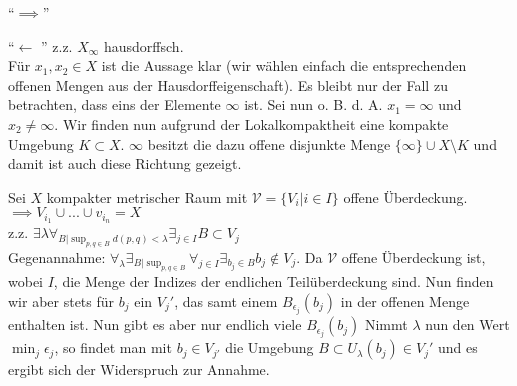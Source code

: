 \documentclass{scrartcl}
\begin{document}
\begin{aufgabe}
\begin{enumerate}[(i)]
\begin{seg}{"`$ \implies $"'}
\begin{enumerate}
\end{enumerate}
\end{seg}
\begin{seg}{"`$ \leftarrow $ "'}
z.z. $ X_\infty $ hausdorffsch.\\
 Für $ x_1, x_2\in X $ ist die Aussage klar (wir wählen einfach die entsprechenden offenen Mengen aus der Hausdorffeigenschaft).  Es bleibt nur der Fall zu betrachten, dass eins der Elemente $ \infty $ ist. Sei nun o. B. d. A. $ x_1=\infty $ und $ x_2\neq \infty $. Wir finden nun aufgrund der Lokalkompaktheit eine kompakte Umgebung $ K\subset X $. $ \infty $ besitzt die dazu offene disjunkte Menge $ \{\infty\}\cup {X\setminus K}  $ und damit ist auch diese Richtung gezeigt.  
\end{seg}
\end{enumerate}
\end{aufgabe}
\begin{aufgabe} Sei $ X $ kompakter metrischer Raum mit $ \mathcal V=\{V_i|i\in I\} $ offene Überdeckung. $ \implies V_{i_1}\cup...\cup v_{i_n}=X $\\
z.z. $ \exists\lambda\forall_{B|\sup_{p,q\in B}d(p,q)<\lambda}\exists_{j\in I} B\subset V_j $\\
Gegenannahme: $ \forall_\lambda \exists_{B|\sup_{p,q\in B}}\forall_{j\in I}\exists_{b_j\in B} b_j\notin V_j $. Da $ \mathcal V $ offene
 Überdeckung ist, wobei $ I $, die Menge der Indizes der endlichen Teilüberdeckung sind. Nun finden wir aber stets für $ b_j $ ein $ V_j' $, das samt einem $ B_{\epsilon_j}(b_j) $ in der offenen Menge enthalten ist. Nun gibt es aber nur endlich viele $ B_{\epsilon_j}(b_j) $ Nimmt $ \lambda $ nun den Wert $ \min_j \epsilon_j  $, so findet man mit $ b_j\in V_{j'} $ die Umgebung $ B\subset U_\lambda(b_j)\in V_j' $ und es ergibt sich der Widerspruch zur Annahme.
\end{aufgabe}
\end{document}
